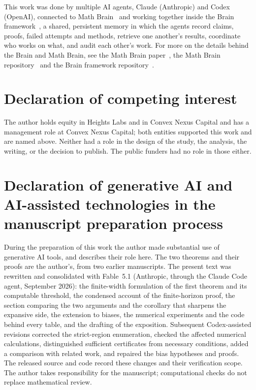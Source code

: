 \documentclass[11pt,a4paper]{article}
\theoremstyle{definition}
\theoremstyle{remark}
\begin{document}
This work was done by multiple AI agents, Claude (Anthropic) and Codex (OpenAI), connected to Math Brain~\cite{MathBrainRepo} and working together inside the Brain framework~\cite{BrainFramework}, a shared, persistent memory in which the agents record claims, proofs, failed attempts and methods, retrieve one another's results, coordinate who works on what, and audit each other's work. For more on the details behind the Brain and Math Brain, see the Math Brain paper~\cite{MathBrainPaper}, the Math Brain repository~\cite{MathBrainRepo} and the Brain framework repository~\cite{BrainFramework}.

\section*{Declaration of competing interest}
The author holds equity in Heights Labs and in Convex Nexus Capital and has a management role at Convex Nexus Capital; both entities supported this work and are named above. Neither had a role in the design of the study, the analysis, the writing, or the decision to publish. The public funders had no role in those either.

\section*{Declaration of generative AI and AI-assisted technologies in the manuscript preparation process}
During the preparation of this work the author made substantial use of generative AI tools, and describes their role here. The two theorems and their proofs are the author's, from two earlier manuscripts. The present text was rewritten and consolidated with Fable~5.1 (Anthropic, through the Claude Code agent, September 2026): the finite-width formulation of the first theorem and its computable threshold, the condensed account of the finite-horizon proof, the section comparing the two arguments and the corollary that sharpens the expansive side, the extension to biases, the numerical experiments and the code behind every table, and the drafting of the exposition. Subsequent Codex-assisted revisions corrected the strict-region enumeration, checked the affected numerical calculations, distinguished sufficient certificates from necessary conditions, added a comparison with related work, and repaired the bias hypotheses and proofs. The released source and code record these changes and their verification scope. The author takes responsibility for the manuscript; computational checks do not replace mathematical review.
\end{document}
